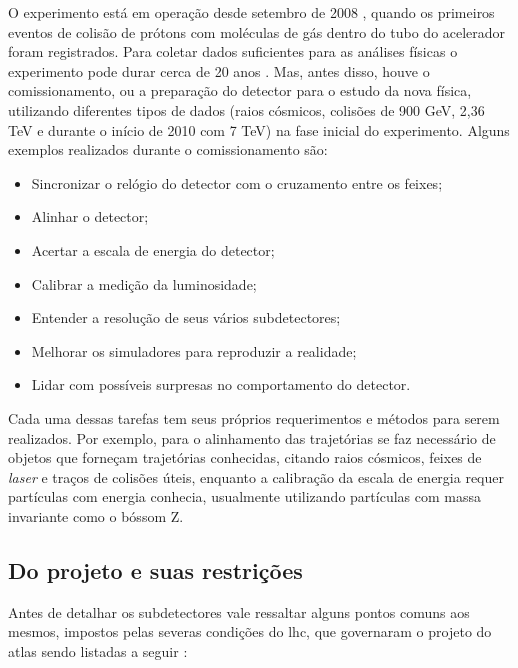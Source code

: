 O experimento está em operação desde setembro de 2008 \cite{webLHC},
quando os primeiros eventos de colisão de prótons com moléculas de gás dentro do tubo do acelerador
foram registrados. Para coletar dados suficientes para as análises físicas o
experimento pode durar cerca de 20 anos \cite{ATLAS_TDR}. Mas, antes disso, 
houve o comissionamento, ou a preparação do detector para o estudo da nova
física, utilizando diferentes tipos de dados (raios cósmicos, colisões de 900 GeV, 2,36
TeV e durante o início de 2010 com 7 TeV) na fase inicial do experimento. 
Alguns exemplos realizados durante o comissionamento são:

\begin{itemize}
\item Sincronizar o relógio do detector com o cruzamento entre os feixes;
\item Alinhar o detector;
\item Acertar a escala de energia do detector;
\item Calibrar a medição da luminosidade;
\item Entender a resolução de seus vários subdetectores;
\item Melhorar os simuladores para reproduzir a realidade;
\item Lidar com possíveis surpresas no comportamento do detector.
\end{itemize}

Cada uma dessas tarefas tem seus próprios requerimentos e métodos para serem
realizados. Por exemplo, para o alinhamento das trajetórias se faz necessário de
objetos que forneçam trajetórias conhecidas, citando raios cósmicos, feixes de \emph{laser} 
e traços de colisões úteis, enquanto a calibração da
escala de energia requer partículas com energia conhecia, usualmente
utilizando partículas com massa invariante como o bóssom Z.

\subsection{Do projeto e suas restrições}
\label{ssec:atlas_restr}

Antes de detalhar os subdetectores vale ressaltar alguns pontos comuns aos
mesmos, impostos pelas severas condições do \gls{lhc}, que 
governaram o projeto do \gls{atlas} sendo listadas a seguir \cite{THESIS_LAR}:



